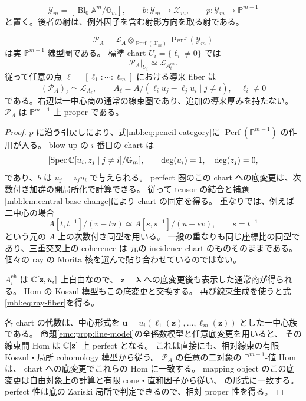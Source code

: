 \[
 \mathscr Y_m=[\operatorname{Bl}_0\mathbb A^m/\mathbb G_m],\qquad
 b:\mathscr Y_m\longrightarrow\mathscr X_m,\qquad
 p:\mathscr Y_m\longrightarrow\mathbb P^{m-1}
\]
と置く。後者の射は、例外因子を含む射影方向を取る射である。

\begin{theorem}
\label{mbl:thm:pencil-category}
\begin{equation}\label{mbl:eq:pencil-category}
 \mathcal P_A
   =\mathcal L_A\otimes_{\operatorname{Perf}(\mathscr X_m)}
                       \operatorname{Perf}(\mathscr Y_m)
\end{equation}
は実 $\mathbb P^{m-1}$-線型圏である。
標準 chart $U_i=\{\ell_i\ne0\}$ では
\[
                  \mathcal P_A|_{U_i}\simeq\mathcal L_{A_i^{\mathrm{ch}}}.
\]
従って任意の点 $\ell=[\ell_1:\cdots:\ell_m]$ における導来 fiber は
\begin{equation}\label{mbl:eq:ray-fiber}
  (\mathcal P_A)_\ell
   \simeq\mathcal L_{A_\ell},\qquad
  A_\ell=A/(\ell_i u_j-\ell_j u_i\mid j\ne i),
       \quad\ell_i\ne0
\end{equation}
である。右辺は一中心商の通常の線束圏であり、追加の導来厚みを持たない。
$\mathcal P_A$ は $\mathbb P^{m-1}$ 上 proper である。
\end{theorem}

\begin{proof}
$p$ に沿う引戻しにより、式\eqref{mbl:eq:pencil-category}に
$\operatorname{Perf}(\mathbb P^{m-1})$ の作用が入る。
blow-up の $i$ 番目の chart は
\[
 [\operatorname{Spec}\mathbb C[u_i,z_j\mid j\ne i]/\mathbb G_m],
 \qquad \deg(u_i)=1,\quad\deg(z_j)=0,
\]
であり、$b$ は $u_j=z_ju_i$ で与えられる。
perfect 圏のこの chart への底変更は、次数付き加群の開局所化で計算できる。
従って tensor の結合と補題\ref{mbl:lem:central-base-change}により chart の同定を得る。
重なりでは、例えば二中心の場合
\[
 A[t,t^{-1}]/(v-tu)
       \simeq A[s,s^{-1}]/(u-sv),\qquad s=t^{-1}
\]
という元の $A$ 上の次数付き同型を用いる。
一般の重なりも同じ座標比の同型であり、三重交叉上の coherence は
元の incidence chart のものそのままである。
個々の ray の Morita 核を選んで貼り合わせているのではない。

$A_i^{\mathrm{ch}}$ は $\mathbb C[\mathbf z,u_i]$ 上自由なので、
$\mathbf z=\boldsymbol\lambda$ への底変更後も表示した通常商が得られる。
Hom の Koszul 模型もこの底変更と交換する。
再び線束生成を使うと式\eqref{mbl:eq:ray-fiber}を得る。

各 chart の代数は、中心形式を
$\mathbf u=u_i(\ell_1(\mathbf z),\ldots,\ell_m(\mathbf z))$ とした一中心族である。
命題\ref{emc:prop:line-model}の全係数模型と任意底変更を用いると、
その線束間 Hom は $\mathbb C[\mathbf z]$ 上 perfect となる。
これは直接にも、相対線束の有限 Koszul・局所 cohomology 模型から従う。
$\mathcal P_A$ の任意の二対象の $\mathbb P^{m-1}$-値 Hom は、
chart への底変更でこれらの Hom に一致する。
mapping object のこの底変更は自由対象上の計算と有限 cone・直和因子から従い、
\cite[Lemmas~2.7 and 2.10]{CRSPerry}の形式に一致する。
perfect 性は底の Zariski 局所で判定できるので、相対 proper 性を得る。
\end{proof}

